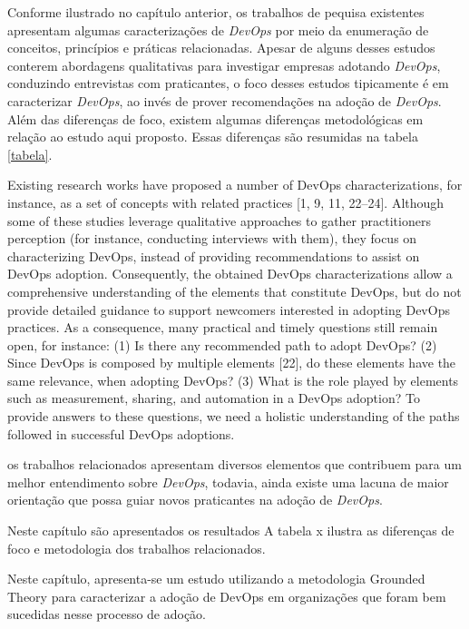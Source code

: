 Conforme ilustrado no capítulo anterior, os trabalhos de pequisa existentes
apresentam algumas caracterizações de \textit{DevOps} por meio da enumeração
de conceitos, princípios e práticas relacionadas. Apesar de alguns desses
estudos conterem abordagens qualitativas para investigar empresas adotando
\textit{DevOps}, conduzindo entrevistas com praticantes, o foco desses estudos
tipicamente é em caracterizar \textit{DevOps}, ao invés de prover recomendações
na adoção de \textit{DevOps}. Além das diferenças de foco, existem algumas
diferenças metodológicas em relação ao estudo aqui proposto. Essas diferenças
são resumidas na tabela \ref{tabela}.

Existing research works have proposed a number of DevOps
characterizations, for instance, as a set of concepts with related
practices [1, 9, 11, 22–24]. Although some of these studies leverage
qualitative approaches to gather practitioners perception (for
instance, conducting interviews with them), they focus on characterizing
DevOps, instead of providing recommendations to assist
on DevOps adoption. Consequently, the obtained DevOps characterizations
allow a comprehensive understanding of the elements
that constitute DevOps, but do not provide detailed guidance to
support newcomers interested in adopting DevOps practices. As a
consequence, many practical and timely questions still remain open,
for instance: (1) Is there any recommended path to adopt DevOps?
(2) Since DevOps is composed by multiple elements [22], do these
elements have the same relevance, when adopting DevOps? (3)
What is the role played by elements such as measurement, sharing,
and automation in a DevOps adoption? To provide answers to these
questions, we need a holistic understanding of the paths followed
in successful DevOps adoptions.


 os trabalhos relacionados apresentam
diversos elementos que contribuem para um melhor entendimento sobre
\textit{DevOps}, todavia, ainda existe uma lacuna de maior orientação que possa
guiar novos praticantes na adoção de \textit{DevOps}.

Neste capítulo são apresentados os resultados
A tabela x ilustra as diferenças
de foco e metodologia dos trabalhos relacionados.

Neste capítulo, apresenta-se um estudo utilizando a metodologia Grounded Theory
para caracterizar a adoção de DevOps em organizações que foram bem sucedidas
nesse processo de adoção.
